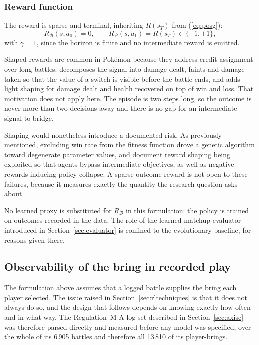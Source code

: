 \documentclass[conference]{IEEEtran}
\begin{document}
\subsubsection{Reward function}
The reward is sparse and terminal, inheriting $R(s_T)$ from (\ref{eq:posg}):
\begin{equation}
R_{\mathcal{B}}(s, a_0) = 0, \qquad
R_{\mathcal{B}}(s, a_1) = R(s_T) \in \{-1, +1\},
\end{equation}
\noindent with $\gamma = 1$, since the horizon is finite and no intermediate
reward is emitted.

Shaped rewards are common in Pok\'emon because they address credit assignment
over long battles: \cite{simoes2020} decomposes the signal into damage dealt,
faints and damage taken so that the value of a switch is visible before the
battle ends, and \cite{grigsby2025} adds light shaping for damage dealt and
health recovered on top of win and loss. That motivation does not apply here.
The episode is two steps long, so the outcome is never more than two decisions
away and there is no gap for an intermediate signal to bridge.

Shaping would nonetheless introduce a documented risk.  As previously mentioned,
excluding win rate from the fitness function drove a genetic algorithm
toward degenerate parameter values\cite{reis2025}, and \cite{karten2026} document reward
shaping being exploited so that agents bypass intermediate objectives, as well
as negative rewards inducing policy collapse. A sparse outcome reward is not
open to these failures, because it measures exactly the quantity the research
question asks about.

No learned proxy is substituted for $R_{\mathcal{B}}$ in this formulation:
the policy is trained on outcomes recorded in the data. The role of the learned
matchup evaluator introduced in Section~\ref{sec:evaluator} is confined to the
evolutionary baseline, for reasons given there.

\subsection{Observability of the bring in recorded play}
\label{sec:observability}

The formulation above assumes that a logged battle supplies the bring each
player selected. The issue raised in Section~\ref{sec:rltechniques} is that it does
not always do so, and the design that follows depends on knowing exactly how
often and in what way. The Regulation~M-A log set described in
Section~\ref{sec:axisc} was therefore parsed directly and measured before any
model was specified, over the whole of its 6\,905 battles and therefore all
13\,810 of its player-brings.
\end{document}
